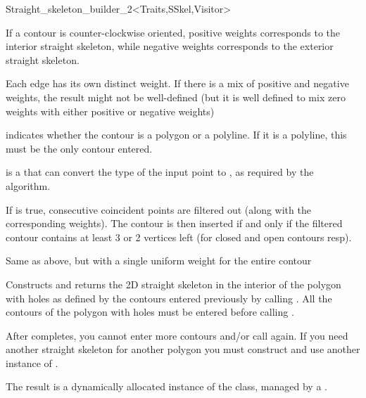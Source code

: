 \begin{ccRefClass}{Straight_skeleton_builder_2<Traits,SSkel,Visitor>}
{If a contour is counter-clockwise oriented, positive weights corresponds to the interior straight skeleton, while negative weights corresponds
to the exterior straight skeleton.

Each edge has its own distinct weight. If there is a mix of positive and negative weights, the result might not be well-defined (but it is well
defined to mix zero weights with either positive or negative weights)

 indicates whether the contour is a polygon or a polyline. If it is a polyline, this must be the only contour entered.

 is a  that can convert the type of the input point to , as required by the algorithm.

If  is true, consecutive coincident points are filtered out (along with the corresponding weights). The contour is then
inserted if and only if the filtered contour contains at least 3 or 2 vertices left (for closed and open contours resp).
}

\ccGlue
{}
{Same as above, but with a single uniform weight for the entire contour}

\ccGlue
{}
{Constructs and returns the 2D straight skeleton in the interior of the polygon with holes as defined by the contours
entered previously by calling . All the contours of the polygon with holes must be entered before
calling .

After  completes, you cannot enter more contours and/or call  again.
If you need another straight skeleton for another polygon you must construct and use another instance of \ccRefName.

The result is a dynamically allocated instance of the  class, managed by a .

}
\end{ccRefClass}
